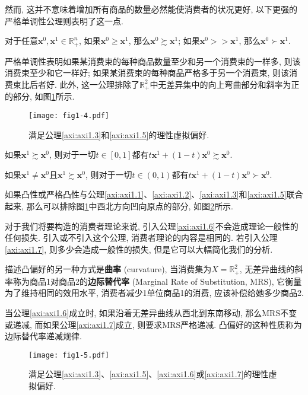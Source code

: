 \documentclass[cn, 12pt, math=mtpro2, bibstyle=apa, blue, twocol]{elegantbook}
\newcommand{\R}{\mathbb{R}}
\newcommand{\x}{\mathbf{x}}
\begin{document}
然而, 这并不意味着增加所有商品的数量必然能使消费者的状况更好, 以下更强的严格单调性公理则表明了这一点.

\begin{axiom}[严格单调性]\label{axi:axi1.5}
对于任意$\x^0,\x^1\in\R^n_+$, 如果$\x^0\ge\x^1$, 那么$\x^0\succsim \x^1$; 如果$\x^0>>\x^1$, 那么$\x^0\succ\x^1$.
\end{axiom}
严格单调性表明如果某消费束的每种商品数量至少和另一个消费束的一样多, 则该消费束至少和它一样好; 如果某消费束的每种商品严格多于另一个消费束, 则该消费束比后者好. 此外, 这一公理排除了$\R^2_+$中无差异集中的向上弯曲部分和斜率为正的部分, 如图\ref{fig1.4}所示.

\begin{figure}
  \centering
  \texttt{[image: fig1-4.pdf]}
  \caption{满足公理\ref{axi:axi1.3}和\ref{axi:axi1.5}的理性虚拟偏好.}\label{fig1.4}
\end{figure}

\begin{axiom}[凸性]\label{axi:axi1.6}
如果$\x^1\succsim\x^0$, 则对于一切$t\in[0,1]$都有$t\x^1+(1-t)\x^0\succsim\x^0$.
\end{axiom}
\begin{axiom}[严格凸性]\label{axi:axi1.7}
如果$\x^1\ne\x^0$且$\x^1\succsim\x^0$, 则对于一切$t\in(0,1)$都有$t\x^1+(1-t)\x^0\succ\x^0$.
\end{axiom}

如果凸性或严格凸性与公理\ref{axi:axi1.1}、\ref{axi:axi1.2}、\ref{axi:axi1.3}和\ref{axi:axi1.5}联合起来, 那么可以排除图\ref{fig1.4}中西北方向凹向原点的部分, 如图\ref{fig1.5}所示.

对于我们将要构造的消费者理论来说, 引入公理\ref{axi:axi1.6}不会造成理论一般性的任何损失. 引入或不引入这个公理, 消费者理论的内容是相同的. 若引入公理\ref{axi:axi1.7}, 则多少会造成一般性的损失, 但是它可以大幅简化我们的分析.

描述凸偏好的另一种方式是\textbf{曲率} (curvature), 当消费集为$X=\R^2_+$, 无差异曲线的斜率称为商品1对商品2的\textbf{边际替代率} (Marginal Rate of Substitution, MRS), 它衡量为了维持相同的效用水平, 消费者减少1单位商品1的消费, 应该补偿给她多少商品2.

当公理\ref{axi:axi1.6}成立时, 如果沿着无差异曲线从西北到东南移动, 那么MRS不变或递减, 而如果公理\ref{axi:axi1.7}成立, 则要求MRS严格递减. 凸偏好的这种性质称为边际替代率递减规律.
\begin{figure}
  \centering
  \texttt{[image: fig1-5.pdf]}
  \caption{满足公理\ref{axi:axi1.3}、\ref{axi:axi1.5}、\ref{axi:axi1.6}或\ref{axi:axi1.7}的理性虚拟偏好.}\label{fig1.5}
\end{figure}
\end{document}
